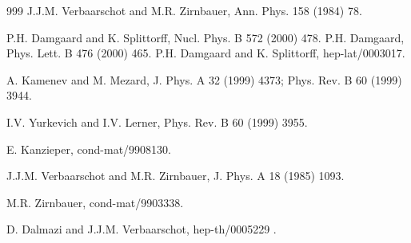 \begin{thebibliography}{999}
      J.J.M. Verbaarschot and M.R. Zirnbauer, 
                      Ann. Phys. 158 (1984) 78.               %

      P.H. Damgaard and K. Splittorff,
                      Nucl. Phys. B 572 (2000) 478.
                      P.H. Damgaard,
                      Phys. Lett. B 476 (2000) 465.
                      P.H. Damgaard and K. Splittorff,
                      hep-lat/0003017.

     A. Kamenev and M. Mezard, 
                      J. Phys. A 32 (1999) 4373;           %
                      Phys. Rev. B 60 (1999) 3944.         %

        I.V. Yurkevich and I.V. Lerner, 
                      Phys. Rev. B 60 (1999) 3955.         %

      E. Kanzieper,
                      cond-mat/9908130.                     %

    J.J.M. Verbaarschot and M.R. Zirnbauer, 
                      J. Phys. A 18 (1985) 1093.            %

     M.R. Zirnbauer, 
                      cond-mat/9903338.                     %

     D. Dalmazi and J.J.M. Verbaarschot,
                      hep-th/0005229 .


\end{thebibliography}
